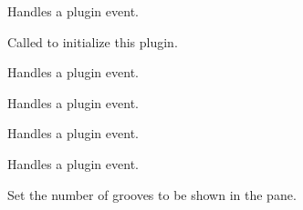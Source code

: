Handles a plugin event.


\label{cbbarhintspluginoninitplugin}


Called to initialize this plugin.


\label{cbbarhintspluginonleftdown}


Handles a plugin event.


\label{cbbarhintspluginonleftup}


Handles a plugin event.


\label{cbbarhintspluginonmotion}


Handles a plugin event.


\label{cbbarhintspluginonsizebarwindow}


Handles a plugin event.


\label{cbbarhintspluginsetgroovecount}


Set the number of grooves to be shown in the pane.

